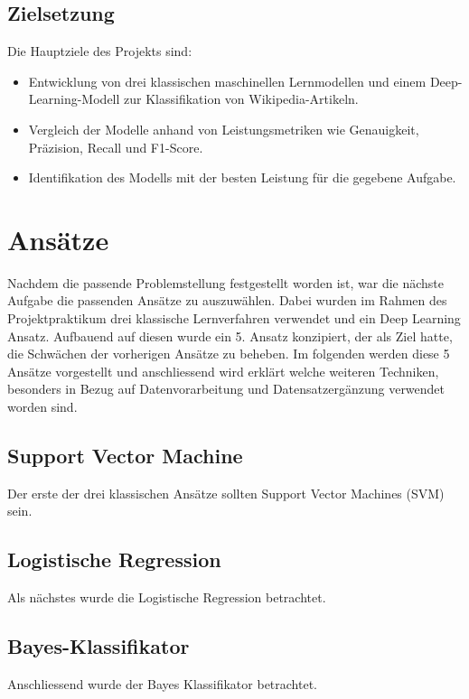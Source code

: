 \documentclass[researchlab,palatino]{AIGpaper}
\begin{document}
\subsection{Zielsetzung}

Die Hauptziele des Projekts sind:

\begin{itemize} \item Entwicklung von drei klassischen maschinellen Lernmodellen und einem Deep-Learning-Modell zur Klassifikation von Wikipedia-Artikeln. \item Vergleich der Modelle anhand von Leistungsmetriken wie Genauigkeit, Präzision, Recall und F1-Score. \item Identifikation des Modells mit der besten Leistung für die gegebene Aufgabe. \end{itemize}

\section{Ansätze}

Nachdem die passende Problemstellung festgestellt worden ist, war die nächste Aufgabe die passenden Ansätze zu auszuwählen. Dabei wurden im Rahmen des Projektpraktikum drei klassische Lernverfahren verwendet und ein Deep Learning Ansatz. Aufbauend auf diesen wurde ein 5. Ansatz konzipiert, der als Ziel hatte, die Schwächen der vorherigen Ansätze zu beheben. Im folgenden werden diese 5 Ansätze vorgestellt und anschliessend wird erklärt welche weiteren Techniken, besonders in Bezug auf Datenvorarbeitung und Datensatzergänzung verwendet worden sind.

\subsection{Support Vector Machine}
Der erste der drei klassischen Ansätze sollten Support Vector Machines (SVM) sein. 



\subsection{Logistische Regression}
Als nächstes wurde die Logistische Regression betrachtet.

\subsection{Bayes-Klassifikator}
Anschliessend wurde der Bayes Klassifikator betrachtet.
\end{document}
